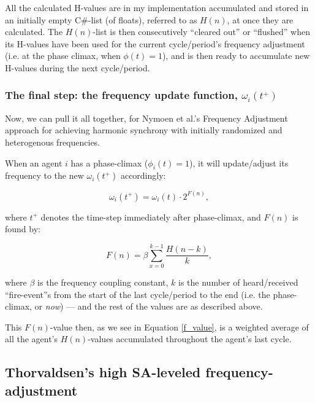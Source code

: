 	All the calculated H-values are in my implementation accumulated and stored in an initially empty C\#-list (of floats), referred to as $H(n)$, at once they are calculated. The $H(n)$-list is then consecutively ``cleared out'' or ``flushed'' when its H-values have been used for the current cycle/period's frequency adjustment (i.e. at the phase climax, when $\phi(t)=1$), and is then ready to accumulate new H-values during the next cycle/period.
	
	\subsubsection{The final step: the frequency update function, $\omega_i(t^+)$}
	
	Now, we can pull it all together, for Nymoen et al.'s Frequency Adjustment approach for achieving harmonic synchrony with initially randomized and heterogenous frequencies.
	
	When an agent $i$ has a phase-climax ($\phi_i(t)=1$), it will update/adjust its frequency to the new $\omega_i(t^+)$ accordingly:
	
	\begin{equation}
	\label{freq_adj}
		\omega_i(t^+) = \omega_i(t) \cdot 2^{F(n)},
	\end{equation}
	
	where $t^+$ denotes the time-step immediately after phase-climax, and $F(n)$ is found by:
	
	\begin{equation}
	\label{f_value}
		F(n) = \beta\sum_{x=0}^{k-1}\frac{H(n-k)}{k},
	\end{equation}
	
	where $\beta$ is the frequency coupling constant, $k$ is the number of heard/received ``fire-event''s from the start of the last cycle/period to the end (i.e. the phase-climax, or \textit{now}) — and the rest of the values are as described above.
	
	This $F(n)$-value then, as we see in Equation \eqref{f_value}, is a weighted average of all the agent's $H(n)$-values accumulated throughout the agent's last cycle.
	
	
	
	
	
	\subsection{Thorvaldsen's high SA-leveled frequency-adjustment}
	
